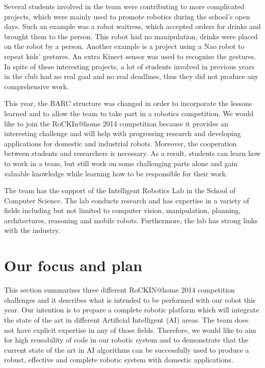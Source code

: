 \documentclass[conference]{IEEEtran}
\begin{document}
Several students involved in the team were contributing to more complicated projects, which were mainly used to promote robotics during the school's open days. Such an example was a robot waitress, which accepted orders for drinks and brought them to the person. This robot had no manipulation, drinks were placed on the robot by a person. Another example is a project using a Nao robot to repeat kids' gestures. An extra Kinect sensor was used to recognize the gestures. In spite of these interesting projects, a lot of students involved in previous years in the club had no real goal and no real deadlines, thus they did not produce any comprehensive work.

This year, the BARC structure was changed in order to incorporate the lessons learned and to allow the team to take part in a robotics competition. We would like to join the RoCKIn@home 2014 competition because it provides an interesting challenge and will help with progressing research and developing applications for domestic and industrial robots. Moreover, the cooperation between students and researchers is necessary. As a result, students can learn how to work in a team, but still work on some challenging parts alone and gain valuable knowledge while learning how to be responsible for their work.

The team has the support of the Intelligent Robotics Lab \cite{irlab} in the School of Computer Science. The lab conducts research and has expertise in a variety of fields including but not limited to computer vision, manipulation, planning, architectures, reasoning and mobile robots. Furthermore, the lab has strong links with the industry. 

 
\section{Our focus and plan}

This section summarizes three different RoCKIN@home 2014 competition challenges and it describes what is intended to be performed with our robot this year. Our intention is to prepare a complete robotic platform which will integrate the state of the art in different Artificial Intelligent (AI) areas. The team does not have explicit expertise in any of those fields. Therefore, we would like to aim for high reusability of code in our robotic system and to demonstrate that the current state of the art in AI algorithms can be successfully used to produce a robust, effective and complete robotic system with domestic applications.  
\end{document}
